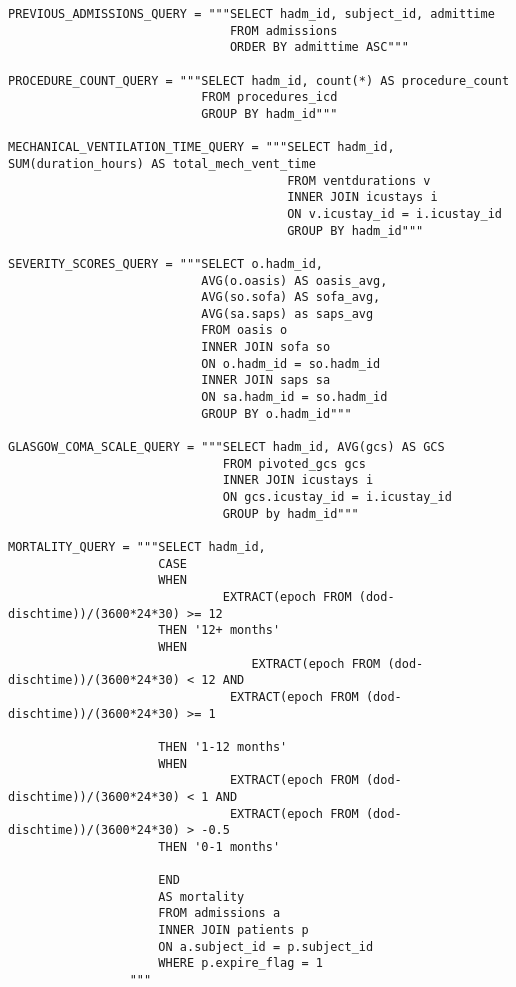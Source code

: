 \documentclass{report}
\begin{document}
\begin{verbatim}
PREVIOUS_ADMISSIONS_QUERY = """SELECT hadm_id, subject_id, admittime
                               FROM admissions
                               ORDER BY admittime ASC"""
                               
PROCEDURE_COUNT_QUERY = """SELECT hadm_id, count(*) AS procedure_count
                           FROM procedures_icd
                           GROUP BY hadm_id"""
                            
MECHANICAL_VENTILATION_TIME_QUERY = """SELECT hadm_id, SUM(duration_hours) AS total_mech_vent_time
                                       FROM ventdurations v
                                       INNER JOIN icustays i
                                       ON v.icustay_id = i.icustay_id
                                       GROUP BY hadm_id"""
                                        
SEVERITY_SCORES_QUERY = """SELECT o.hadm_id, 
                           AVG(o.oasis) AS oasis_avg, 
                           AVG(so.sofa) AS sofa_avg, 
                           AVG(sa.saps) as saps_avg
                           FROM oasis o
                           INNER JOIN sofa so
                           ON o.hadm_id = so.hadm_id
                           INNER JOIN saps sa
                           ON sa.hadm_id = so.hadm_id
                           GROUP BY o.hadm_id"""
                           
GLASGOW_COMA_SCALE_QUERY = """SELECT hadm_id, AVG(gcs) AS GCS
                              FROM pivoted_gcs gcs
                              INNER JOIN icustays i
                              ON gcs.icustay_id = i.icustay_id
                              GROUP by hadm_id"""

MORTALITY_QUERY = """SELECT hadm_id,
                     CASE
                     WHEN 
                              EXTRACT(epoch FROM (dod-dischtime))/(3600*24*30) >= 12
                     THEN '12+ months'			
                     WHEN 
                        	      EXTRACT(epoch FROM (dod-dischtime))/(3600*24*30) < 12 AND
                               EXTRACT(epoch FROM (dod-dischtime))/(3600*24*30) >= 1

                     THEN '1-12 months'
                     WHEN
                               EXTRACT(epoch FROM (dod-dischtime))/(3600*24*30) < 1 AND
                               EXTRACT(epoch FROM (dod-dischtime))/(3600*24*30) > -0.5
                     THEN '0-1 months'	
									
                     END
                     AS mortality
                     FROM admissions a
                     INNER JOIN patients p
                     ON a.subject_id = p.subject_id
                     WHERE p.expire_flag = 1
                 """
                                 

\end{verbatim}
\end{document}
